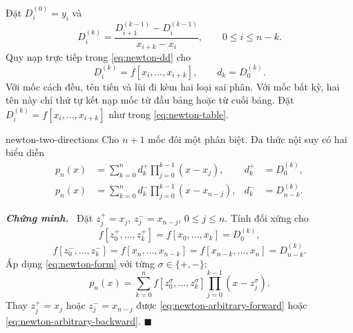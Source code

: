 \documentclass[12pt,a4paper,oneside]{book}
\numberwithin{algorithm}{chapter}
\theoremstyle{definition}
\newenvironment{chungminh}{\par\medskip\noindent\textbf{\textit{\color{mainblue}Chứng minh.}}\ }{\hfill$\blacksquare$\par\medskip}
\begin{document}
Đặt $D_i^{(0)}=y_i$ và
\begin{equation}\label{eq:newton-table}
 D_i^{(k)}=\frac{D_{i+1}^{(k-1)}-D_i^{(k-1)}}{x_{i+k}-x_i},
 \qquad0\leq i\leq n-k.
\end{equation}
Quy nạp trực tiếp trong \eqref{eq:newton-dd} cho
\[
 D_i^{(k)}=f[x_i,\ldots,x_{i+k}],\qquad d_k=D_0^{(k)}.
\]
Với mốc cách đều, tên tiến và lùi đi kèm hai loại sai phân. Với mốc bất kỳ, hai tên này chỉ thứ tự kết nạp mốc từ đầu bảng hoặc từ cuối bảng. Đặt $D_i^{(k)}=f[x_i,\ldots,x_{i+k}]$ như trong \eqref{eq:newton-table}.
\begin{menhde}{}{newton-two-directions}
Cho $n+1$ mốc đôi một phân biệt. Đa thức nội suy có hai biểu diễn
\begin{align}
 p_n(x)&=\sum_{k=0}^{n}d_k^+\prod_{j=0}^{k-1}(x-x_j),
 &d_k^+&=D_0^{(k)},\label{eq:newton-arbitrary-forward}\\
 p_n(x)&=\sum_{k=0}^{n}d_k^-\prod_{j=0}^{k-1}(x-x_{n-j}),
 &d_k^-&=D_{n-k}^{(k)}.\label{eq:newton-arbitrary-backward}
\end{align}
\end{menhde}
\begin{chungminh}
Đặt $z_j^+=x_j$, $z_j^-=x_{n-j}$, $0\leq j\leq n$. Tính đối xứng cho
\[
 f[z_0^+,\ldots,z_k^+]=f[x_0,\ldots,x_k]=D_0^{(k)},
\]
\[
 f[z_0^-,\ldots,z_k^-]
 =f[x_n,\ldots,x_{n-k}]
 =f[x_{n-k},\ldots,x_n]=D_{n-k}^{(k)}.
\]
Áp dụng \eqref{eq:newton-form} với từng $\sigma\in\{+,-\}$:
\[
 p_n(x)=\sum_{k=0}^{n}f[z_0^\sigma,\ldots,z_k^\sigma]
                   \prod_{j=0}^{k-1}(x-z_j^\sigma).
\]
Thay $z_j^+=x_j$ hoặc $z_j^-=x_{n-j}$ được \eqref{eq:newton-arbitrary-forward} hoặc \eqref{eq:newton-arbitrary-backward}.
\end{chungminh}
\end{document}
